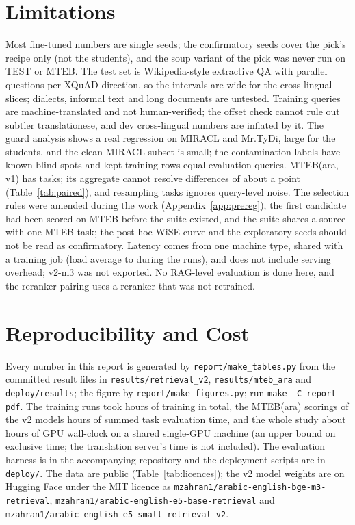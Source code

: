\documentclass[11pt]{article}
\newcommand{\tabfont}{\footnotesize\setlength{\tabcolsep}{3.2pt}}
\begin{document}
\begin{table}[t]
\centering\tabfont

\caption{Data card: sources, roles and licences. ``No licence tag'' means the Hub card does not state one; nothing is assumed.}\label{tab:licences}
\end{table}

\section{Limitations}
Most fine-tuned numbers are single seeds; the confirmatory seeds cover the pick's recipe only (not the students), and the soup variant of the pick was never run on TEST or MTEB.
The test set is Wikipedia-style extractive QA with \NumStyleN{} parallel questions per XQuAD direction, so the intervals are wide for the cross-lingual slices; dialects, informal text and long documents are untested.
Training queries are machine-translated and not human-verified; the offset check cannot rule out subtler translationese, and dev cross-lingual numbers are inflated by it.
The guard analysis shows a real regression on MIRACL and Mr.TyDi, large for the students, and the clean MIRACL subset is small; the contamination labels have known blind spots and \NumLeakRows{} kept training rows equal evaluation queries.
MTEB(ara, v1) has \NumMtebTasks{} tasks; its aggregate cannot resolve differences of about a point (Table~\ref{tab:paired}), and resampling tasks ignores query-level noise.
The selection rules were amended during the work (Appendix~\ref{app:prereg}), the first candidate had been scored on MTEB before the suite existed, and the suite shares a source with one MTEB task; the post-hoc WiSE curve and the exploratory seeds should not be read as confirmatory.
Latency comes from one machine type, shared with a training job (load average \NumLoadLow{} to \NumLoadHigh{} during the runs), and does not include serving overhead; v2-m3 was not exported.
No RAG-level evaluation is done here, and the reranker pairing uses a reranker that was not retrained.

\section{Reproducibility and Cost}
Every number in this report is generated by \texttt{report/make\_tables.py} from the committed result files in \texttt{results/retrieval\_v2}, \texttt{results/mteb\_ara} and \texttt{deploy/results}; the figure by \texttt{report/make\_figures.py};
run \texttt{make -C report pdf}. The \NumGpuRuns{} training runs took \NumGpuTrainHours{} hours of training in total, the MTEB(ara) scorings of the v2 models \NumGpuMtebHours{} hours of summed task evaluation time, and the whole study about \NumGpuWallHours{} hours of GPU wall-clock on a shared single-GPU machine (an upper bound on exclusive time; the translation server's time is not included).
The evaluation harness is in the accompanying repository and the deployment scripts are in \texttt{deploy/}.
The data are public (Table~\ref{tab:licences}); the v2 model weights are on Hugging Face under the MIT licence as \texttt{mzahran1/arabic-english-bge-m3-retrieval}, \texttt{mzahran1/arabic-english-e5-base-retrieval} and \texttt{mzahran1/arabic-english-e5-small-retrieval-v2}.
\end{document}
